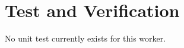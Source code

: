 \documentclass{article}
\begin{document}
\section*{Test and Verification}
\begin{flushleft}
	No unit test currently exists for this worker.
\end{flushleft}
\end{document}
